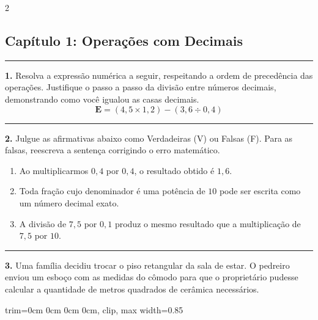\documentclass[twoside, 10pt, a4paper]{article}
\newlength{\espacoPosTitulo}\setlength{\espacoPosTitulo}{0.3cm}
\newlength{\espacoPreQuestao}\setlength{\espacoPreQuestao}{0.1cm}
\newlength{\espacoQuestao}\setlength{\espacoQuestao}{0.2cm}
\newcommand{\larguraTikz}{0.85\linewidth}
\begin{document}
\par\vspace{0.3cm}
\raggedcolumns
\begin{multicols*}{2}
\vspace{0.1cm}

\subsection*{Capítulo 1: Operações com Decimais}
\vspace{-0.2cm}\noindent\rule{\linewidth}{1.5pt} 
\par\vspace{\espacoPosTitulo}
\textbf{1.} Resolva a expressão numérica a seguir, respeitando a ordem de precedência das operações. Justifique o passo a passo da divisão entre números decimais, demonstrando como você igualou as casas decimais.
$$ \textbf{E} = (4,5 \times 1,2) - \left( 3,6 \div 0,4 \right) $$
\par\vspace{\espacoQuestao}

\noindent\textcolor{CorLinha}{\rule{\linewidth}{0.5pt}} 
\par\vspace{\espacoPreQuestao}
\textbf{2.} Julgue as afirmativas abaixo como Verdadeiras (V) ou Falsas (F). Para as falsas, reescreva a sentença corrigindo o erro matemático.
\begin{enumerate}[label=\Roman*.]
    \item Ao multiplicarmos $ 0,4 $ por $ 0,4 $, o resultado obtido é $ 1,6 $.
    \item Toda fração cujo denominador é uma potência de $ 10 $ pode ser escrita como um número decimal exato.
    \item A divisão de $ 7,5 $ por $ 0,1 $ produz o mesmo resultado que a multiplicação de $ 7,5 $ por $ 10 $.
\end{enumerate}
\par\vspace{\espacoQuestao}

\noindent\textcolor{CorLinha}{\rule{\linewidth}{0.5pt}} 
\par\vspace{\espacoPreQuestao}
\textbf{3.} Uma família decidiu trocar o piso retangular da sala de estar. O pedreiro enviou um esboço com as medidas do cômodo para que o proprietário pudesse calcular a quantidade de metros quadrados de cerâmica necessários.
\begin{center}
\begin{adjustbox}{trim=0cm 0cm 0cm 0cm, clip, max width=\larguraTikz}
\end{adjustbox}
\end{center}
\end{multicols*}
\end{document}
